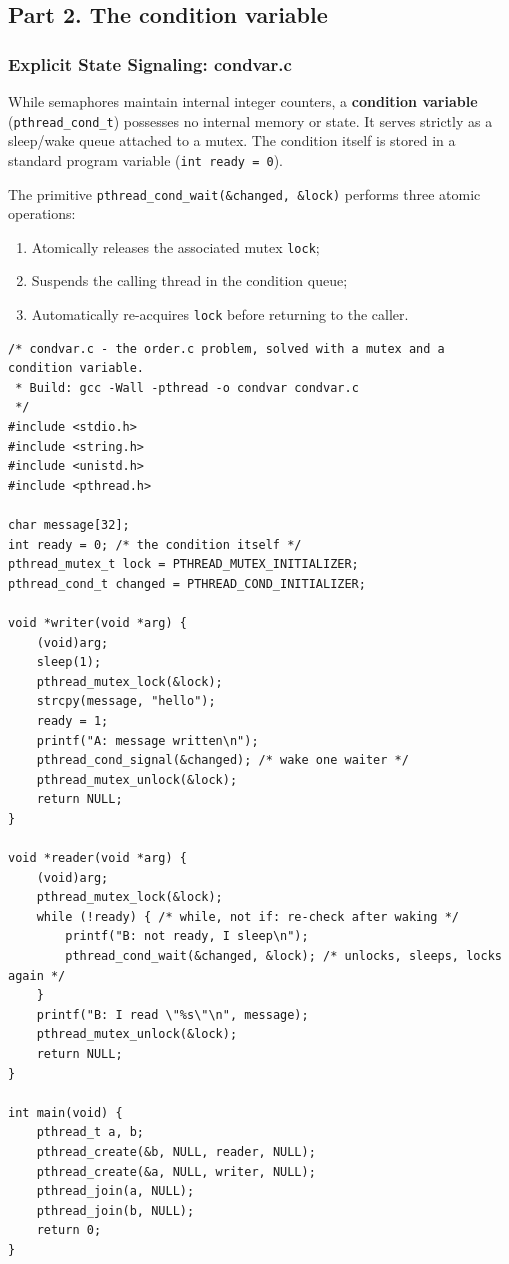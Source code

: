 \documentclass{labreport}
\begin{document}
\subsection{Part 2. The condition variable}

\subsubsection{Explicit State Signaling: condvar.c}
While semaphores maintain internal integer counters, a \textbf{condition variable} (\texttt{pthread\_cond\_t}) possesses no internal memory or state. It serves strictly as a sleep/wake queue attached to a mutex. The condition itself is stored in a standard program variable (\texttt{int ready = 0}).

The primitive \texttt{pthread\_cond\_wait(\&changed, \&lock)} performs three atomic operations:
\begin{enumerate}[label=(\alph*), noitemsep]
    \item Atomically releases the associated mutex \texttt{lock};
    \item Suspends the calling thread in the condition queue;
    \item Automatically re-acquires \texttt{lock} before returning to the caller.
\end{enumerate}

\begin{lstlisting}[style=c]
/* condvar.c - the order.c problem, solved with a mutex and a condition variable.
 * Build: gcc -Wall -pthread -o condvar condvar.c
 */
#include <stdio.h>
#include <string.h>
#include <unistd.h>
#include <pthread.h>

char message[32];
int ready = 0; /* the condition itself */
pthread_mutex_t lock = PTHREAD_MUTEX_INITIALIZER;
pthread_cond_t changed = PTHREAD_COND_INITIALIZER;

void *writer(void *arg) {
    (void)arg;
    sleep(1);
    pthread_mutex_lock(&lock);
    strcpy(message, "hello");
    ready = 1;
    printf("A: message written\n");
    pthread_cond_signal(&changed); /* wake one waiter */
    pthread_mutex_unlock(&lock);
    return NULL;
}

void *reader(void *arg) {
    (void)arg;
    pthread_mutex_lock(&lock);
    while (!ready) { /* while, not if: re-check after waking */
        printf("B: not ready, I sleep\n");
        pthread_cond_wait(&changed, &lock); /* unlocks, sleeps, locks again */
    }
    printf("B: I read \"%s\"\n", message);
    pthread_mutex_unlock(&lock);
    return NULL;
}

int main(void) {
    pthread_t a, b;
    pthread_create(&b, NULL, reader, NULL);
    pthread_create(&a, NULL, writer, NULL);
    pthread_join(a, NULL);
    pthread_join(b, NULL);
    return 0;
}
\end{lstlisting}
\end{document}
